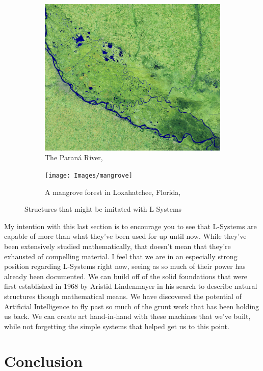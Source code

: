 \documentclass[12pt,twoside]{reedthesis}
\begin{document}
\begin{figure}[h]
\begin{subfigure}{0.52\linewidth}
		\includegraphics[width=\linewidth]{Images/ParanaRiver}
		\caption{The Paraná River, \cite{dauphin2020}}
		\label{ParanaRiver}
	\end{subfigure}
	\begin{subfigure}{0.5\linewidth}
		\centering
		\texttt{[image: Images/mangrove]}
		\caption{A mangrove forest in Loxahatchee, Florida, \cite{mangrove}}
		\label{Mangrove}
	\end{subfigure}
	\caption{Structures that might be imitated with L-Systems}
	\label{PossibleLSystems}
	\end{figure}
	
	My intention with this last section is to encourage you to see that L-Systems are capable of more than what they've been used for up until now. While they've been extensively studied mathematically, that doesn't mean that they're exhausted of compelling material. I feel that we are in an especially strong position regarding L-Systems right now, seeing as so much of their power has already been documented. We can build off of the solid foundations that were first established in 1968 by Aristid Lindenmayer in his search to describe natural structures though mathematical means. We have discovered the potential of Artificial Intelligence to fly past so much of the grunt work that has been holding us back. We can create art hand-in-hand with these machines that we've built, while not forgetting the simple systems that helped get us to this point.
	
\chapter*{Conclusion}
	\setcounter{section}{0}
	
\end{document}
